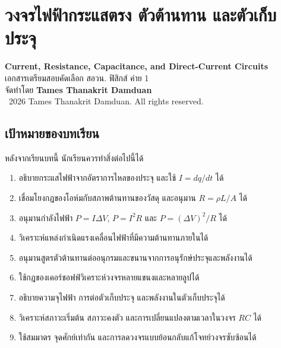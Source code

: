 
\chapter{วงจรไฟฟ้ากระแสตรง ตัวต้านทาน และตัวเก็บประจุ}

\begin{center}
    {\Large \textbf{Current, Resistance, Capacitance, and Direct-Current Circuits}}\\[4pt]
    {\normalsize เอกสารเตรียมสอบคัดเลือก สอวน. ฟิสิกส์ ค่าย 1}\\[6pt]
    {\normalsize จัดทำโดย \textbf{Tames Thanakrit Damduan}}\\[2pt]
    {\footnotesize \textcopyright\ 2026 Tames Thanakrit Damduan. All rights reserved.}\\[8pt]
\end{center}

\section*{เป้าหมายของบทเรียน}

หลังจากเรียนบทนี้ นักเรียนควรทำสิ่งต่อไปนี้ได้

\begin{enumerate}
    \item อธิบายกระแสไฟฟ้าจากอัตราการไหลของประจุ และใช้ $I=dq/dt$ ได้
    \item เชื่อมโยงกฎของโอห์มกับสภาพต้านทานของวัสดุ และอนุมาน $R=\rho L/A$ ได้
    \item อนุมานกำลังไฟฟ้า $P=I\Delta V$, $P=I^2R$ และ $P=(\Delta V)^2/R$ ได้
    \item วิเคราะห์แหล่งกำเนิดแรงเคลื่อนไฟฟ้าที่มีความต้านทานภายในได้
    \item อนุมานสูตรตัวต้านทานต่ออนุกรมและขนานจากการอนุรักษ์ประจุและพลังงานได้
    \item ใช้กฎของเคอร์ชอฟฟ์วิเคราะห์วงจรหลายแขนงและหลายลูปได้
    \item อธิบายความจุไฟฟ้า การต่อตัวเก็บประจุ และพลังงานในตัวเก็บประจุได้
    \item วิเคราะห์สภาวะเริ่มต้น สภาวะคงตัว และการเปลี่ยนแปลงตามเวลาในวงจร $RC$ ได้
    \item ใช้สมมาตร จุดศักย์เท่ากัน และการลดวงจรแบบย้อนกลับแก้โจทย์วงจรซับซ้อนได้
\end{enumerate}

